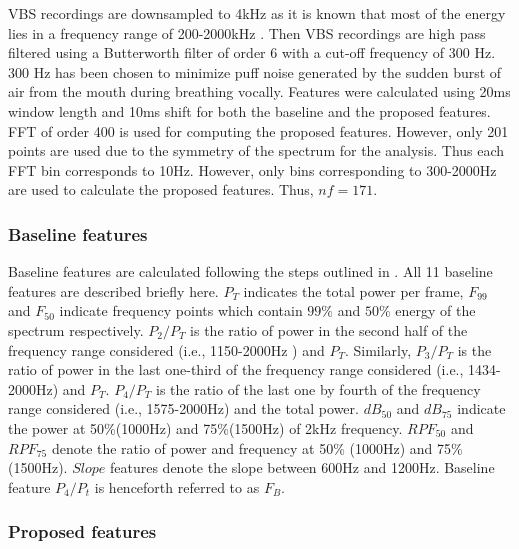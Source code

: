 \documentclass{article}
\begin{document}
VBS recordings are downsampled to 4kHz as it is known that most of the energy lies in a frequency range of 200-2000kHz \cite{sarkar2015auscultation}. Then VBS recordings are high pass filtered using a Butterworth filter of order 6 with a cut-off frequency of 300 Hz. 300 Hz has been chosen to minimize puff noise generated by the sudden burst of air from the mouth during breathing vocally. Features were calculated using 20ms window length and 10ms shift for both the baseline and the proposed features. FFT of order 400 is used for computing the proposed features. However, only 201 points are used due to the symmetry of the spectrum for the analysis. Thus each FFT bin corresponds to 10Hz. However, only bins corresponding to 300-2000Hz are used to calculate the proposed features. Thus, \(nf=171\).

\subsubsection{Baseline features}
Baseline features are calculated following the steps outlined in \cite{tabata2018changes}. 
All 11 baseline features are described briefly here. $P_T$ indicates the total power per frame, $F_{99}$ and $F_{50}$ indicate frequency points which contain \(99 \%\)  and \(50 \%\) energy of the spectrum respectively. $P_2/P_T$ is the ratio of power in the second half of the frequency range considered (i.e., 1150-2000Hz ) and $P_T$. Similarly, $P_3/P_T$ is the ratio of power in the last one-third of the frequency range considered (i.e., 1434-2000Hz) and $P_T$. $P_4/P_T$ is the ratio of the last one by fourth of the frequency range considered (i.e., 1575-2000Hz) and the total power. $dB_{50}$ and $dB_{75}$ indicate the power at 50\%(1000Hz) and 75\%(1500Hz) of 2kHz frequency. $RPF_{50}$ and $RPF_{75}$ denote the ratio of power and frequency at 50\% (1000Hz) and 75\% (1500Hz). $Slope$ features denote the slope between 600Hz and 1200Hz. Baseline feature $P_{4}/P_{t}$ is henceforth referred to as $F_{B}$.

\subsubsection{Proposed features}
\end{document}

